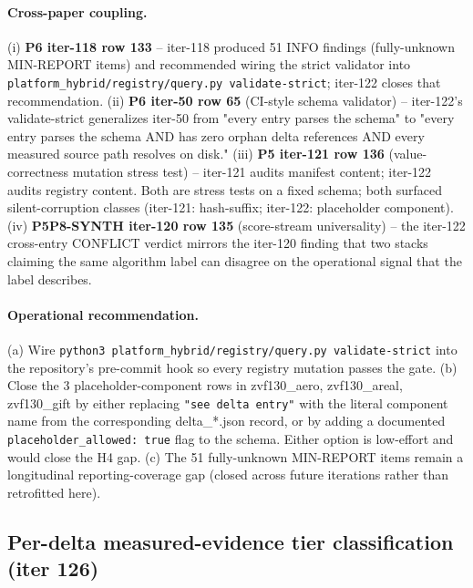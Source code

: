 \documentclass{article}
\begin{document}
\paragraph{Cross-paper coupling.}
(i) \textbf{P6 iter-118 row 133} -- iter-118 produced 51 INFO findings
(fully-unknown MIN-REPORT items) and recommended wiring the strict
validator into \texttt{platform_hybrid/registry/query.py validate-strict}; iter-122
closes that recommendation. (ii) \textbf{P6 iter-50 row 65} (CI-style
schema validator) -- iter-122's validate-strict generalizes iter-50
from "every entry parses the schema" to "every entry parses the schema
AND has zero orphan delta references AND every measured source path
resolves on disk." (iii) \textbf{P5 iter-121 row 136} (value-correctness
mutation stress test) -- iter-121 audits manifest content; iter-122
audits registry content. Both are stress tests on a fixed schema; both
surfaced silent-corruption classes (iter-121: hash-suffix; iter-122:
placeholder component). (iv) \textbf{P5P8-SYNTH iter-120 row 135}
(score-stream universality) -- the iter-122 cross-entry CONFLICT
verdict mirrors the iter-120 finding that two stacks claiming the same
algorithm label can disagree on the operational signal that the label
describes.

\paragraph{Operational recommendation.}
(a) Wire \texttt{python3 platform_hybrid/registry/query.py validate-strict} into the
repository's pre-commit hook so every registry mutation passes the gate.
(b) Close the 3 placeholder-component rows in zvf130\_aero, zvf130\_areal,
zvf130\_gift by either replacing \texttt{"see delta entry"} with the
literal component name from the corresponding delta\_*.json record, or
by adding a documented \texttt{placeholder\_allowed: true} flag to the
schema. Either option is low-effort and would close the H4 gap. (c)
The 51 fully-unknown MIN-REPORT items remain a longitudinal
reporting-coverage gap (closed across future iterations rather than
retrofitted here). 

\subsection{Per-delta measured-evidence tier classification (iter 126)}
\label{sec:p6-iter126-evidence-tier}
\end{document}
